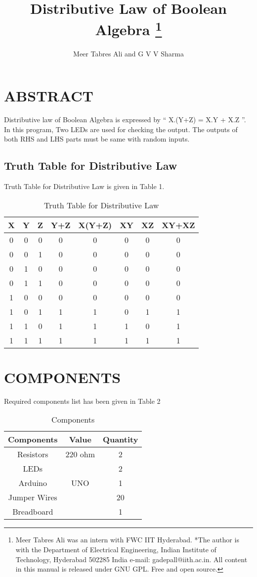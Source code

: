 \documentclass[conference]{IEEEtran}
\title{
{Distributive Law of Boolean Algebra}
\thanks{Meer Tabres Ali was an intern with FWC IIT Hyderabad. *The author is with the Department of Electrical Engineering, Indian Institute of Technology, Hyderabad 502285 India e-mail: gadepall@iith.ac.in. All content in this manual is released under GNU GPL. Free and open source.}
}
\author{Meer Tabres Ali and G V V Sharma}
\begin{document}
\maketitle
\section{ABSTRACT}
Distributive law of Boolean Algebra is expressed by “ X.(Y+Z) = X.Y + X.Z ”. In this program, Two LEDs are used for checking the output. The outputs of both RHS and LHS parts must be same with random inputs.

\subsection{Truth Table for Distributive Law}
Truth Table for Distributive Law is given in Table 1.
\begin{table}[htbp]
    \centering
\begin{tabular}{ | c | c | c | c | c | c | c | c | } \hline
X & Y & Z & Y+Z & X(Y+Z) & XY & XZ & XY+XZ \\\hline
0 & 0 & 0 & 0 & 0 & 0 & 0 & 0 \\
0 & 0 & 1 & 0 & 0 & 0 & 0 & 0 \\
0 & 1 & 0 & 0 & 0 & 0 & 0 & 0 \\
0 & 1 & 1 & 0 & 0 & 0 & 0 & 0 \\
1 & 0 & 0 & 0 & 0 & 0 & 0 & 0 \\
1 & 0 & 1 & 1 & 1 & 0 & 1 & 1 \\
1 & 1 & 0 & 1 & 1 & 1 & 0 & 1 \\
1 & 1 & 1 & 1 & 1 & 1 & 1 & 1 \\ \hline
\end{tabular}
\caption{\label{tab:widgets}Truth Table for Distributive Law}
\end{table}
\section{COMPONENTS}
Required components list has been given in Table 2
\begin{table}[h]
\centering
\begin{tabular}{| c | c | c |} \hline
Components & Value & Quantity \\\hline
Resistors & 220 ohm & 2 \\
LEDs &  & 2 \\
Arduino & UNO & 1 \\
Jumper Wires &  & 20 \\
Breadboard & & 1 \\ 
\hline
\end{tabular}
\caption{\label{tab:widgets}Components}
\end{table}
\end{document}
